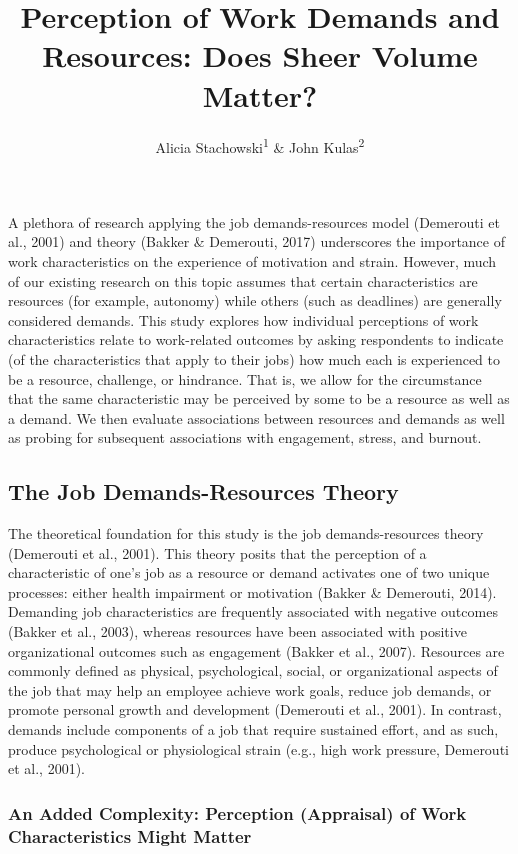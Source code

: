 \documentclass[
  man]{apa6}
\title{Perception of Work Demands and Resources: Does Sheer Volume Matter?}
\author{Alicia Stachowski\textsuperscript{1} \& John Kulas\textsuperscript{2}}
\date{}
\affiliation{\vspace{0.5cm}\textsuperscript{1} University of Wisconsin - Stout\\\textsuperscript{2} eRg}
\begin{document}
\maketitle

A plethora of research applying the job demands-resources model (Demerouti et al., 2001) and theory (Bakker \& Demerouti, 2017) underscores the importance of work characteristics on the experience of motivation and strain. However, much of our existing research on this topic assumes that certain characteristics are resources (for example, autonomy) while others (such as deadlines) are generally considered demands. This study explores how individual perceptions of work characteristics relate to work-related outcomes by asking respondents to indicate (of the characteristics that apply to their jobs) how much each is experienced to be a resource, challenge, or hindrance. That is, we allow for the circumstance that the same characteristic may be perceived by some to be a resource as well as a demand. We then evaluate associations between resources and demands as well as probing for subsequent associations with engagement, stress, and burnout.

\hypertarget{the-job-demands-resources-theory}{%
\subsection{The Job Demands-Resources Theory}\label{the-job-demands-resources-theory}}

The theoretical foundation for this study is the job demands-resources theory (Demerouti et al., 2001). This theory posits that the perception of a characteristic of one's job as a resource or demand activates one of two unique processes: either health impairment or motivation (Bakker \& Demerouti, 2014). Demanding job characteristics are frequently associated with negative outcomes (Bakker et al., 2003), whereas resources have been associated with positive organizational outcomes such as engagement (Bakker et al., 2007). Resources are commonly defined as physical, psychological, social, or organizational aspects of the job that may help an employee achieve work goals, reduce job demands, or promote personal growth and development (Demerouti et al., 2001). In contrast, demands include components of a job that require sustained effort, and as such, produce psychological or physiological strain (e.g., high work pressure, Demerouti et al., 2001).

\hypertarget{an-added-complexity-perception-appraisal-of-work-characteristics-might-matter}{%
\subsubsection{An Added Complexity: Perception (Appraisal) of Work Characteristics Might Matter}\label{an-added-complexity-perception-appraisal-of-work-characteristics-might-matter}}
\end{document}
